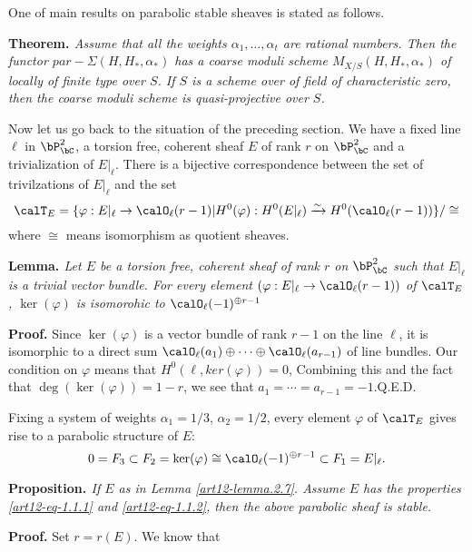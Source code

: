 One of main results on parabolic stable sheaves is stated as follows.

\medskip
\noindent
{\bfseries {} Theorem. \label{art12-thm-2.6}} \cite{art12-key7}\textit{ Assume that all the weights $\alpha_{1}, \ldots, \alpha_{t}$ are rational numbers. Then the functor $par-\Sigma(H, H_{*}, \alpha_{*})$ has a coarse moduli scheme $M_{X/S}(H, H_{*}, \alpha_{*})$ of locally of finite type over $S$. If $S$ is a scheme over of field of characteristic zero, then the coarse moduli scheme is quasi-projective over $S$.}

Now let us go back to the situation of the preceding section. We have a fixed line $\ell$ in $\bP_{\bC}^{2}$, a torsion free, coherent sheaf $E$ of rank $r$ on $\bP_{\bC}^{2}$ and a trivialization of $E|_{\ell}$. There is a bijective correspondence between the set of trivilzations of $E|_{\ell}$ and the set
$$
\calT_{E}=\{\varphi :E|_{\ell} \rightarrow \calO_{\ell}(r-1) |H^{0}(\varphi) : H^{0}(E|_{\ell}) \xrightarrow{\sim}H^{0}(\calO_{\ell}(r-1))\}/\cong
$$
where $\cong$ means isomorphism as quotient sheaves.

\medskip
\noindent
{\bfseries {} Lemma. \label{art12-lemma.2.7}} \textit{Let $E$ be a torsion free, coherent sheaf of rank $r$ on $\bP_{\bC}^{2}$ such that $E|_{\ell}$ is a trivial vector bundle. For every element $(\varphi: E|_{\ell} \rightarrow \calO_{\ell}(r-1))$ of $\calT_{E}$, $\ker(\varphi)$ is isomorohic to $\calO_{\ell}(-1)^{\oplus r-1}$} 

\medskip
\noindent
{\bfseries Proof.} Since $\ker(\varphi)$ is a vector bundle of rank $r-1$ on the line $\ell$, it is isomorphic to a direct sum $\calO_{\ell}(a_{1}) \oplus \cdots \oplus \calO_{\ell}(a_{r-1})$ of line bundles. Our condition on $\varphi$ means that $H^{0}(\ell, ker(\varphi))=0$, Combining this and the fact that $\deg(\ker(\varphi))=1-r$, we see that $a_{1}=\cdots=a_{r-1}=-1$.\hfill Q.E.D. 

Fixing a system of weights $\alpha_{1} =1/3$, $\alpha_{2}=1/2$, every element $\varphi$ of $\calT_{E}$
gives rise to a parabolic structure of $E$:
$$
0 =F_{3} \subset F_{2} =\ker(\varphi) \cong \calO_{\ell}(-1)^{\oplus r-1} \subset F_{1}=E|_{\ell}.
$$

\medskip
\noindent
{\bfseries {} Proposition. \label{art12-Prop.2.8}} \textit{If $E$ as in Lemma \ref{art12-lemma.2.7}. Assume $E$ has the properties \eqref{art12-eq-1.1.1} and \eqref{art12-eq-1.1.2}, then the above parabolic sheaf is stable.}

\medskip
\noindent
{\bfseries Proof.} Set $r=r(E)$. We know that

